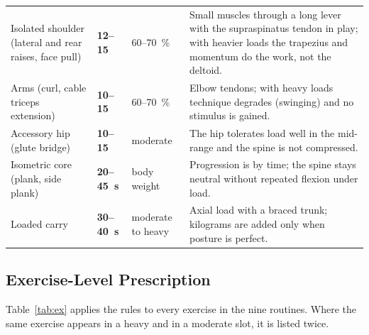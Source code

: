 \documentclass[11pt,a4paper]{article}
\newcommand{\rng}[1]{\textbf{#1}}
\begin{document}
\begin{longtable}{L{4.1cm} L{1.7cm} L{1.9cm} L{7.8cm}}
Isolated shoulder (lateral and rear raises, face pull) & \rng{12--15} & 60--70~\% & Small muscles through a long lever with the supraspinatus tendon in play; with heavier loads the trapezius and momentum do the work, not the deltoid. \\
Arms (curl, cable triceps extension) & \rng{10--15} & 60--70~\% & Elbow tendons; with heavy loads technique degrades (swinging) and no stimulus is gained. \\
Accessory hip (glute bridge) & \rng{10--15} & moderate & The hip tolerates load well in the mid-range and the spine is not compressed. \\
Isometric core (plank, side plank) & \rng{20--45~s} & body weight & Progression is by time; the spine stays neutral without repeated flexion under load. \\
Loaded carry & \rng{30--40~s} & moderate to heavy & Axial load with a braced trunk; kilograms are added only when posture is perfect. \\
\end{longtable}

\subsection*{Exercise-Level Prescription}

Table~\ref{tab:ex} applies the rules to every exercise in the nine routines. Where the same exercise appears in a heavy and in a moderate slot, it is listed twice.
\end{document}
